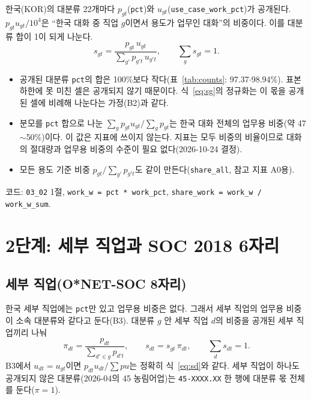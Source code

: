 \documentclass[11pt]{article}
\begin{document}
한국(KOR)의 대분류 22개마다 $p_{gt}$(\texttt{pct})와 $u_{gt}$(\texttt{use\_case\_work\_pct})가 공개된다. $p_{gt} u_{gt} / 10^4$은 ``한국 대화 중 직업 $g$이면서 용도가 업무인 대화''의 비중이다. 이를 대분류 합이 1이 되게 나눈다.
\begin{equation}
s_{gt} = \frac{p_{gt}\, u_{gt}}{\sum_{g'} p_{g't}\, u_{g't}}, \qquad \sum_g s_{gt} = 1.
\label{eq:sg}
\end{equation}
\begin{itemize}[leftmargin=*]
  \item 공개된 대분류 \texttt{pct}의 합은 100\%보다 작다(표~\ref{tab:counts}: 97.37$\cdot$98.94\%). 표본 하한에 못 미친 셀은 공개되지 않기 때문이다. 식~\eqref{eq:sg}의 정규화는 이 몫을 공개된 셀에 비례해 나눈다는 가정(B2)과 같다.
  \item 분모를 \texttt{pct} 합으로 나눈 $\sum_g p_{gt} u_{gt} / \sum_g p_{gt}$는 한국 대화 전체의 업무용 비중(약 47$\sim$50\%)이다. 이 값은 지표에 쓰이지 않는다. 지표는 모두 비중의 비율이므로 대화의 절대량과 업무용 비중의 수준이 필요 없다(2026-10-24 결정).
  \item 모든 용도 기준 비중 $p_{gt} / \sum_{g'} p_{g't}$도 같이 만든다(\texttt{share\_all}, 참고 지표 A0용).
\end{itemize}
코드: \texttt{03\_02} 1절, \texttt{work\_w = pct * work\_pct}, \texttt{share\_work = work\_w / work\_w\_sum}.

\section{2단계: 세부 직업과 SOC 2018 6자리}

\subsection{세부 직업(O*NET-SOC 8자리)}

한국 세부 직업에는 \texttt{pct}만 있고 업무용 비중은 없다. 그래서 세부 직업의 업무용 비중이 소속 대분류와 같다고 둔다(B3). 대분류 $g$ 안 세부 직업 $d$의 비중을 공개된 세부 직업끼리 나눠
\begin{equation}
\pi_{dt} = \frac{p_{dt}}{\sum_{d' \in g} p_{d't}}, \qquad s_{dt} = s_{gt}\, \pi_{dt}, \qquad \sum_d s_{dt} = 1.
\label{eq:sd}
\end{equation}
B3에서 $u_{dt} = u_{gt}$이면 $p_{dt} u_{dt} / \sum p u$는 정확히 식~\eqref{eq:sd}와 같다. 세부 직업이 하나도 공개되지 않은 대분류(2026-04의 45 농림어업)는 \texttt{45-XXXX.XX} 한 행에 대분류 몫 전체를 둔다($\pi = 1$).
\end{document}
